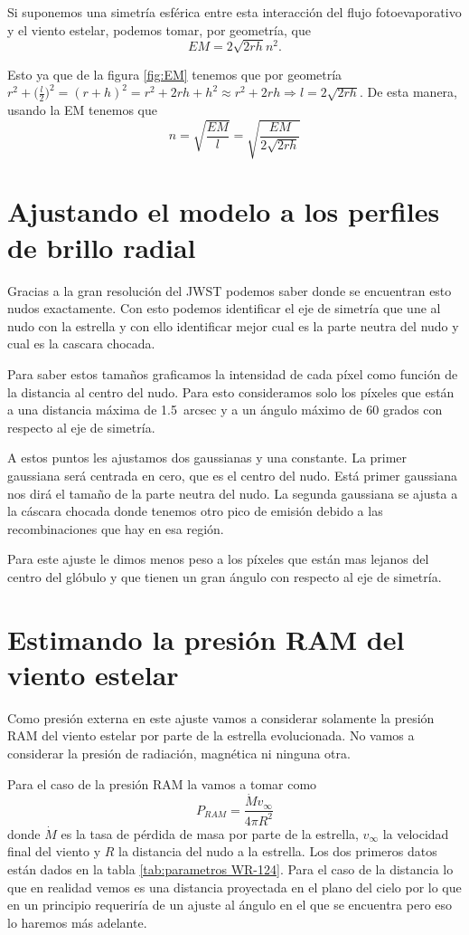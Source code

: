 \documentclass{book}
\begin{document}
Si suponemos una simetría esférica entre esta interacción del flujo fotoevaporativo y el viento estelar, podemos tomar, por geometría, que
\[EM=2\sqrt{2rh}n^2.\]


Esto ya que de la figura \ref{fig:EM} tenemos que por geometría $r^2+\Big(\frac{l}{2}\Big)^2=(r+h)^2=r^2+2rh+h^2\approx r^2+2rh\Rightarrow l=2\sqrt{2rh}$. De esta manera, usando la EM tenemos que \[n=\sqrt{\frac{EM}{l}}=\sqrt{\frac{EM}{2\sqrt{2rh}}}\] 

\section{Ajustando el modelo a los perfiles de brillo radial}

Gracias a la gran resolución del JWST podemos saber donde se encuentran esto nudos exactamente. Con esto podemos identificar el eje de simetría que une al nudo con la estrella y con ello identificar mejor cual es la parte neutra del nudo y cual es la cascara chocada.

Para saber estos tamaños graficamos la intensidad de cada píxel como función de la distancia al centro del nudo. Para esto consideramos solo los píxeles que están a una distancia máxima de \SI{1.5}{arcsec} y a un ángulo máximo de 60 grados con respecto al eje de simetría.

A estos puntos les ajustamos dos gaussianas y una constante. La primer gaussiana será centrada en cero, que es el centro del nudo. Está primer gaussiana nos dirá el tamaño de la parte neutra del nudo. La segunda gaussiana se ajusta a la cáscara chocada donde tenemos otro pico de emisión debido a las recombinaciones que hay en esa región.

Para este ajuste le dimos menos peso a los píxeles que están mas lejanos del centro del glóbulo y que tienen un gran ángulo con respecto al eje de simetría.

\section{Estimando la presión RAM del viento estelar}

Como presión externa en este ajuste vamos a considerar solamente la presión RAM del viento estelar por parte de la estrella evolucionada. No vamos a considerar la presión de radiación, magnética ni ninguna otra. 

Para el caso de la presión RAM la vamos a tomar como \[P_{RAM}= \frac{\dot{M}v_\infty}{4\pi R^2}\] donde $\dot{M}$ es la tasa de pérdida de masa por parte de la estrella, $v_\infty$ la velocidad final del viento y $R$ la distancia del nudo a la estrella. Los dos primeros datos están dados en la tabla \ref{tab:parametros WR-124}. Para el caso de la distancia lo que en realidad vemos es una distancia proyectada en el plano del cielo por lo que en un principio requeriría de un ajuste al ángulo en el que se encuentra pero eso lo haremos más adelante.
\end{document}
